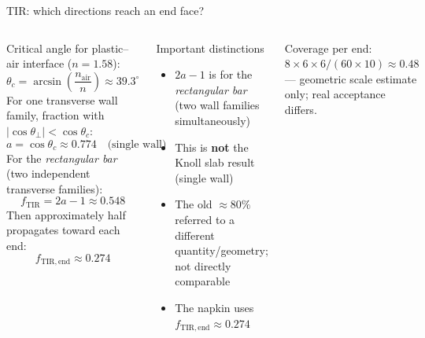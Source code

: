 \documentclass[aspectratio=169,9pt]{beamer}
\begin{document}
\begin{frame}{TIR: which directions reach an end face?}
\begin{columns}[T]
Critical angle for plastic--air interface ($n=1.58$):
\[
  \theta_c = \arcsin\!\left(\frac{n_{\mathrm{air}}}{n}\right) \approx 39.3^\circ
\]
For one transverse wall family, fraction with $|\cos\theta_\perp| < \cos\theta_c$:
\[
  a = \cos\theta_c \approx 0.774 \quad \text{(single wall)}
\]
For the \emph{rectangular bar} (two independent transverse families):
\[
  f_{\mathrm{TIR}} = 2a - 1 \approx 0.548
\]
Then approximately half propagates toward each end:
\[
  f_{\mathrm{TIR,end}} \approx 0.274
\]

\begin{alertblock}{Important distinctions}
\begin{itemize}
  \item $2a-1$ is for the \emph{rectangular bar} (two wall families simultaneously)
  \item This is \textbf{not} the Knoll slab result (single wall)
  \item The old $\approx80\%$ referred to a different quantity/geometry; not directly comparable
  \item The napkin uses $f_{\mathrm{TIR,end}} \approx 0.274$
\end{itemize}
\end{alertblock}
\vspace{4pt}
{\small Coverage per end: $8\times6\times6/(60\times10) \approx 0.48$ —
geometric scale estimate only; real acceptance differs.}
\end{columns}
\end{frame}
\end{document}
